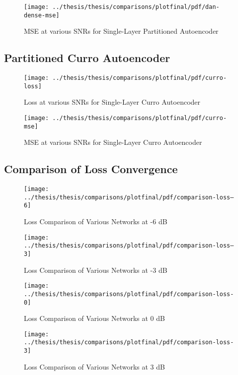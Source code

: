 \begin{figure}[!ht]
\centering
\texttt{[image: ../thesis/thesis/comparisons/plotfinal/pdf/dan-dense-mse]}
\caption{MSE at various SNRs for Single-Layer Partitioned Autoencoder\cite{stow}}
\end{figure}

\subsection{Partitioned Curro Autoencoder}

\begin{figure}[!ht]
\centering
\texttt{[image: ../thesis/thesis/comparisons/plotfinal/pdf/curro-loss]}
\caption{Loss at various SNRs for Single-Layer Curro Autoencoder}
\end{figure}

\begin{figure}[!ht]
\centering
\texttt{[image: ../thesis/thesis/comparisons/plotfinal/pdf/curro-mse]}
\caption{MSE at various SNRs for Single-Layer Curro Autoencoder}
\end{figure}

\subsection{Comparison of Loss Convergence}

\begin{figure}[!ht]
\centering
\texttt{[image: ../thesis/thesis/comparisons/plotfinal/pdf/comparison-loss--6]}
\caption{Loss Comparison of Various Networks at -6 dB}
\end{figure}

\begin{figure}[!ht]
\centering
\texttt{[image: ../thesis/thesis/comparisons/plotfinal/pdf/comparison-loss--3]}
\caption{Loss Comparison of Various Networks at -3 dB}
\end{figure}

\begin{figure}[!ht]
\centering
\texttt{[image: ../thesis/thesis/comparisons/plotfinal/pdf/comparison-loss-0]}
\caption{Loss Comparison of Various Networks at 0 dB}
\end{figure}

\begin{figure}[!ht]
\centering
\texttt{[image: ../thesis/thesis/comparisons/plotfinal/pdf/comparison-loss-3]}
\caption{Loss Comparison of Various Networks at 3 dB}
\end{figure}

